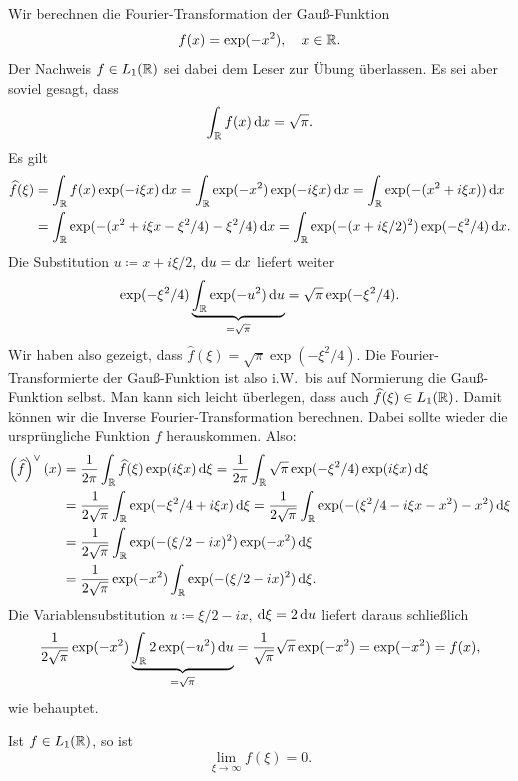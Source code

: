 \begin{example}
Wir berechnen die Fourier-Transformation der Gauß-Funktion
\[
  f(x) = \exp(-x^{2}), \quad x \in \mathbb{R}.
\]
Der Nachweis $ f \in L_{1}(\mathbb{R}) $ sei dabei dem Leser zur Übung überlassen. Es sei aber soviel 
gesagt, dass
\[
  \int_{\R} f(x) \dif x = \sqrt{\pi}.
\]
Es gilt
\begin{align*}
   \widehat{f}(\xi)
&= \int_{\R} f(x) \exp(-i\xi x) \dif x
 = \int_{\R} \exp(-x^{2}) \exp(-i\xi x) \dif x
 = \int_{\R} \exp(-(x^{2} + i\xi x)) \dif x \\
&= \int_{\R} \exp(-(x^{2} + i\xi x - \xi^{2} / 4) - \xi^{2}/4 ) \dif x
 = \int_{\R} \exp(-(x + i\xi / 2)^{2}) \exp(-\xi^{2}/4) \dif x.
\end{align*}
Die Substitution $ u \coloneqq x + i\xi / 2 $, $ \dif u = \dif x $ liefert weiter
\[
    \exp(-\xi^{2}/4) \underbrace{ \int_{\R} \exp(-u^{2}) \dif u }_{=\sqrt{\pi}}
  = \sqrt{\pi} \exp(-\xi^{2}/4).
\]
Wir haben also gezeigt, dass $ \widehat{f}(\xi) = \sqrt{\pi} \exp(-\xi^{2}/4) $. Die
Fourier-Transformierte der Gauß-Funktion ist also i.W.\ bis auf Normierung die Gauß-Funktion selbst.
Man kann sich leicht überlegen, dass auch $ \widehat{f}(\xi) \in L_{1}(\mathbb{R}) $. Damit können wir
die Inverse Fourier-Transformation berechnen. Dabei sollte wieder die ursprüngliche Funktion $ f $
herauskommen. Also:
\begin{align*}
   \left( \widehat{f} \right)^{\vee}(x)
&= \frac{1}{2\pi} \int_{\R} \widehat{f}(\xi) \exp(i\xi x) \dif \xi
 = \frac{1}{2\pi} \int_{\R} \sqrt{\pi} \exp(-\xi^{2}/4) \exp(i\xi x) \dif \xi \\
&= \frac{1}{2\sqrt{\pi}} \int_{\R} \exp(-\xi^{2}/4 + i\xi x) \dif \xi
 = \frac{1}{2\sqrt{\pi}} \int_{\R} \exp(- (\xi^{2}/4 - i\xi x - x^{2}) - x^{2}) \dif \xi \\
&= \frac{1}{2\sqrt{\pi}} \int_{\R} \exp(-(\xi/2 - ix)^{2}) \exp(-x^{2}) \dif \xi \\
&= \frac{1}{2\sqrt{\pi}} \exp(-x^{2}) \int_{\R} \exp(-(\xi/2 - ix)^{2}) \dif \xi.
\end{align*}
Die Variablensubstitution $ u \coloneqq \xi / 2 - ix $, $ \dif \xi = 2 \dif u $ liefert 
daraus schließlich
\[
    \frac{1}{2\sqrt{\pi}} \exp(-x^{2}) \underbrace{ \int_{\R} 2\exp(-u^{2}) \dif u }_{=\sqrt{\pi}}
  = \frac{1}{\sqrt{\pi}} \sqrt{\pi} \exp(-x^{2})
  = \exp(-x^{2}) = f(x),
\]
wie behauptet.
\end{example}

\begin{proposition}\label{prop:Riemann-Lebesgue}
Ist $ f \in L_{1}(\mathbb{R}) $, so ist
\[
  \lim\limits_{\xi \to \infty} f(\xi) = 0.
\]
\end{proposition}

